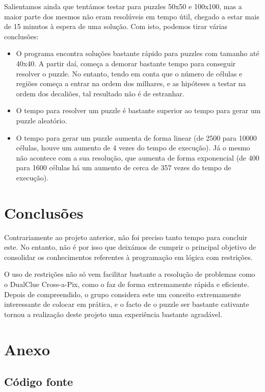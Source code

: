 \documentclass[runningheads,a4paper]{llncs}
\begin{document}
Salientamos ainda que tentámos testar para puzzles 50x50 e 100x100, mas a maior parte dos mesmos não eram resolúveis em tempo útil, chegado a estar mais de 15 minutos à espera de uma solução. Com isto, podemos tirar várias conclusões:

\begin{itemize}
\item O programa encontra soluções bastante rápido para puzzles com tamanho até 40x40. A partir daí, começa a demorar bastante tempo para conseguir resolver o puzzle. No entanto, tendo em conta que o número de células e regiões começa a entrar na ordem dos milhares, e as hipóteses a testar na ordem dos decaliões, tal resultado não é de estranhar.
\item O tempo para resolver um puzzle é bastante superior ao tempo para gerar um puzzle aleatório.
\item O tempo para gerar um puzzle aumenta de forma linear (de 2500 para 10000 células, houve um aumento de 4 vezes do tempo de execução). Já o mesmo não acontece com a sua resolução, que aumenta de forma exponencial (de 400 para 1600 células há um aumento de cerca de 357 vezes do tempo de execução).
\end{itemize}

\section{Conclusões}
Contrariamente ao projeto anterior, não foi preciso tanto tempo para concluir este. No entanto, não é por isso que deixámos de cumprir o principal objetivo de consolidar os conhecimentos referentes à programação em lógica com restrições.

O uso de restrições não só vem facilitar bastante a resolução de problemas como o DualClue Cross-a-Pix, como o faz de forma extremamente rápida e eficiente. Depois de compreendido, o grupo considera este um conceito extremamente interessante de colocar em prática, e o facto de o puzzle ser bastante cativante tornou a realização deste projeto uma experiência bastante agradável. 

\section*{Anexo}

\subsection*{Código fonte}

\end{document}
